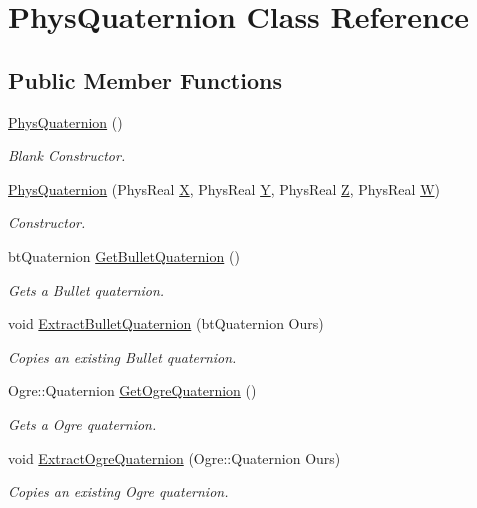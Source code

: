 \hypertarget{classPhysQuaternion}{
\section{PhysQuaternion Class Reference}
\label{d5/d19/classPhysQuaternion}
}
\subsection*{Public Member Functions}
\begin{DoxyCompactItemize}
\item 
\hyperlink{classPhysQuaternion_afa90934d42b3a55d4b06bcf4c076123b}{PhysQuaternion} ()
\begin{DoxyCompactList}\small\item\em Blank Constructor. \item\end{DoxyCompactList}\item 
\hyperlink{classPhysQuaternion_aa0cbd53e7a9e624a3f0f22aa94618e17}{PhysQuaternion} (PhysReal \hyperlink{classPhysQuaternion_ac6ef4975979103a0285379e166dafc9c}{X}, PhysReal \hyperlink{classPhysQuaternion_a2b07bc54cfd68f82588cb869f8ef4428}{Y}, PhysReal \hyperlink{classPhysQuaternion_a991d092617466f15ab7c297059668cf2}{Z}, PhysReal \hyperlink{classPhysQuaternion_a5569a775ccde5755ffa4a12a0a31c555}{W})
\begin{DoxyCompactList}\small\item\em Constructor. \item\end{DoxyCompactList}\item 
btQuaternion \hyperlink{classPhysQuaternion_a63ed0cf13cd77d8e89af9748db2e4893}{GetBulletQuaternion} ()
\begin{DoxyCompactList}\small\item\em Gets a Bullet quaternion. \item\end{DoxyCompactList}\item 
void \hyperlink{classPhysQuaternion_a112b979d18c915cb719781949d74ff83}{ExtractBulletQuaternion} (btQuaternion Ours)
\begin{DoxyCompactList}\small\item\em Copies an existing Bullet quaternion. \item\end{DoxyCompactList}\item 
Ogre::Quaternion \hyperlink{classPhysQuaternion_a30adc9ec3604da6ac9df49dc25b6fd31}{GetOgreQuaternion} ()
\begin{DoxyCompactList}\small\item\em Gets a Ogre quaternion. \item\end{DoxyCompactList}\item 
void \hyperlink{classPhysQuaternion_a63dd5036c86a5353094ad7b089ede3ab}{ExtractOgreQuaternion} (Ogre::Quaternion Ours)
\begin{DoxyCompactList}\small\item\em Copies an existing Ogre quaternion. \item\end{DoxyCompactList}\end{DoxyCompactItemize}
